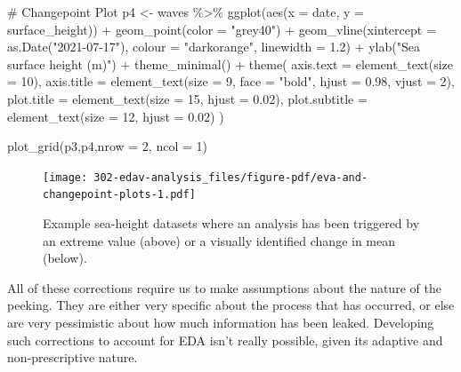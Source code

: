 \documentclass[
  letterpaper,
  DIV=11,
  numbers=noendperiod]{scrreprt}
\newenvironment{Shaded}{\begin{snugshade}}{\end{snugshade}}
\newcommand{\AttributeTok}[1]{\textcolor[rgb]{0.40,0.45,0.13}{#1}}
\newcommand{\CommentTok}[1]{\textcolor[rgb]{0.37,0.37,0.37}{#1}}
\newcommand{\DecValTok}[1]{\textcolor[rgb]{0.68,0.00,0.00}{#1}}
\newcommand{\FloatTok}[1]{\textcolor[rgb]{0.68,0.00,0.00}{#1}}
\newcommand{\FunctionTok}[1]{\textcolor[rgb]{0.28,0.35,0.67}{#1}}
\newcommand{\NormalTok}[1]{\textcolor[rgb]{0.00,0.23,0.31}{#1}}
\newcommand{\OtherTok}[1]{\textcolor[rgb]{0.00,0.23,0.31}{#1}}
\newcommand{\SpecialCharTok}[1]{\textcolor[rgb]{0.37,0.37,0.37}{#1}}
\newcommand{\StringTok}[1]{\textcolor[rgb]{0.13,0.47,0.30}{#1}}
\begin{document}
\begin{Shaded}
\begin{Highlighting}[]
\CommentTok{\# Changepoint Plot}
\NormalTok{p4 }\OtherTok{\textless{}{-}}\NormalTok{ waves }\SpecialCharTok{\%\textgreater{}\%} 
  \FunctionTok{ggplot}\NormalTok{(}\FunctionTok{aes}\NormalTok{(}\AttributeTok{x =}\NormalTok{ date, }\AttributeTok{y =}\NormalTok{ surface\_height)) }\SpecialCharTok{+}
  \FunctionTok{geom\_point}\NormalTok{(}\AttributeTok{color =} \StringTok{"grey40"}\NormalTok{) }\SpecialCharTok{+} 
  \FunctionTok{geom\_vline}\NormalTok{(}\AttributeTok{xintercept =} \FunctionTok{as.Date}\NormalTok{(}\StringTok{"2021{-}07{-}17"}\NormalTok{),}
             \AttributeTok{colour =} \StringTok{"darkorange"}\NormalTok{,}
             \AttributeTok{linewidth =} \FloatTok{1.2}\NormalTok{) }\SpecialCharTok{+}
  \FunctionTok{ylab}\NormalTok{(}\StringTok{"Sea surface height (m)"}\NormalTok{) }\SpecialCharTok{+}
  \FunctionTok{theme\_minimal}\NormalTok{() }\SpecialCharTok{+}
    \FunctionTok{theme}\NormalTok{(}
    \AttributeTok{axis.text =} \FunctionTok{element\_text}\NormalTok{(}\AttributeTok{size =} \DecValTok{10}\NormalTok{),}
    \AttributeTok{axis.title =} \FunctionTok{element\_text}\NormalTok{(}\AttributeTok{size =} \DecValTok{9}\NormalTok{, }\AttributeTok{face =} \StringTok{"bold"}\NormalTok{,  }\AttributeTok{hjust =} \FloatTok{0.98}\NormalTok{, }\AttributeTok{vjust =} \DecValTok{2}\NormalTok{),}
    \AttributeTok{plot.title =} \FunctionTok{element\_text}\NormalTok{(}\AttributeTok{size =} \DecValTok{15}\NormalTok{, }\AttributeTok{hjust =} \FloatTok{0.02}\NormalTok{),}
    \AttributeTok{plot.subtitle =} \FunctionTok{element\_text}\NormalTok{(}\AttributeTok{size =} \DecValTok{12}\NormalTok{, }\AttributeTok{hjust =} \FloatTok{0.02}\NormalTok{)}
\NormalTok{  )}

\FunctionTok{plot\_grid}\NormalTok{(p3,p4,}\AttributeTok{nrow =} \DecValTok{2}\NormalTok{, }\AttributeTok{ncol =} \DecValTok{1}\NormalTok{)}
\end{Highlighting}
\end{Shaded}

\begin{figure}[H]

{\centering \texttt{[image: 302-edav-analysis\_files/figure-pdf/eva-and-changepoint-plots-1.pdf]}

}

\caption{Example sea-height datasets where an analysis has been
triggered by an extreme value (above) or a visually identified change in
mean (below).}

\end{figure}%

All of these corrections require us to make assumptions about the nature
of the peeking. They are either very specific about the process that has
occurred, or else are very pessimistic about how much information has
been leaked. Developing such corrections to account for EDA isn't really
possible, given its adaptive and non-prescriptive nature.
\end{document}
